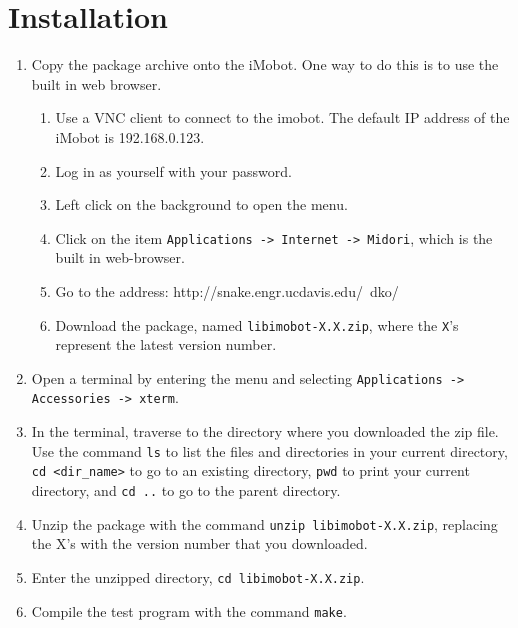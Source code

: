 \documentclass[11pt]{report}
\begin{document}
\chapter{Installation}
\begin{enumerate}
\item Copy the package archive onto the iMobot. One way to do this is to use the
built in web browser.
  \begin{enumerate}
  \item Use a VNC client to connect to the imobot. The default IP address of the iMobot is 192.168.0.123.
  \item Log in as yourself with your password.
  \item Left click on the background to open the menu.
  \item Click on the item \texttt{Applications -> Internet -> Midori}, which is the built in web-browser.
  \item Go to the address: http://snake.engr.ucdavis.edu/~dko/
  \item Download the package, named \texttt{libimobot-X.X.zip}, where the \texttt{X}'s represent the latest version number.
  \end{enumerate}
\item Open a terminal by entering the menu and selecting \texttt{Applications -> Accessories -> xterm}.
\item In the terminal, traverse to the directory where you downloaded the zip
file. Use the command \texttt{ls} to list the files and directories in your
current directory, \texttt{cd <dir\_name>} to go to an existing directory, \texttt{pwd} to print
your current directory, and \texttt{cd ..} to go to the parent directory.
\item Unzip the package with the command \texttt{unzip libimobot-X.X.zip}, replacing the X's with the version number that you downloaded.
\item Enter the unzipped directory, \texttt{cd libimobot-X.X.zip}. 
\item Compile the test program with the command \texttt{make}.
\end{enumerate}
\end{document}
